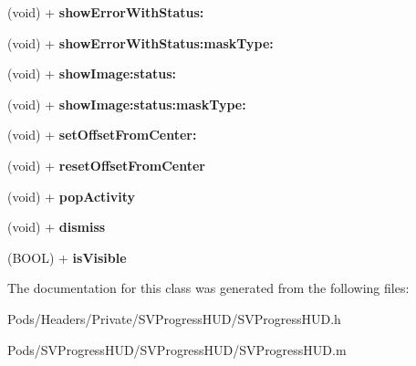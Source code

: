 \begin{DoxyCompactItemize}
\mbox{\label{interface_s_v_progress_h_u_d_a8128a4e1addbb9e840fc308dc0321753}} 
(void) + {\bfseries show\+Error\+With\+Status\+:}
\item 
\mbox{\label{interface_s_v_progress_h_u_d_ae3fddc19857ad2352b997f3867d11cf4}} 
(void) + {\bfseries show\+Error\+With\+Status\+:mask\+Type\+:}
\item 
\mbox{\label{interface_s_v_progress_h_u_d_a9247d6fec57607765c3afa43a897d5b2}} 
(void) + {\bfseries show\+Image\+:status\+:}
\item 
\mbox{\label{interface_s_v_progress_h_u_d_a70f7fe07899b0820895caa2f7ab8eefd}} 
(void) + {\bfseries show\+Image\+:status\+:mask\+Type\+:}
\item 
\mbox{\label{interface_s_v_progress_h_u_d_a7dbb68407c09cde2392da28dee66459f}} 
(void) + {\bfseries set\+Offset\+From\+Center\+:}
\item 
\mbox{\label{interface_s_v_progress_h_u_d_a6a77bb5e66a35e649e8abd9d2a801866}} 
(void) + {\bfseries reset\+Offset\+From\+Center}
\item 
\mbox{\label{interface_s_v_progress_h_u_d_a760194f4076a9371fd2a749c097d070e}} 
(void) + {\bfseries pop\+Activity}
\item 
\mbox{\label{interface_s_v_progress_h_u_d_aed897a5b64a03fea94b402edef361f55}} 
(void) + {\bfseries dismiss}
\item 
\mbox{\label{interface_s_v_progress_h_u_d_a2d37e07a5739b10d9429bd1dbaa0206c}} 
(B\+O\+OL) + {\bfseries is\+Visible}
\end{DoxyCompactItemize}


The documentation for this class was generated from the following files\+:\begin{DoxyCompactItemize}
\item 
Pods/\+Headers/\+Private/\+S\+V\+Progress\+H\+U\+D/S\+V\+Progress\+H\+U\+D.\+h\item 
Pods/\+S\+V\+Progress\+H\+U\+D/\+S\+V\+Progress\+H\+U\+D/S\+V\+Progress\+H\+U\+D.\+m\end{DoxyCompactItemize}
